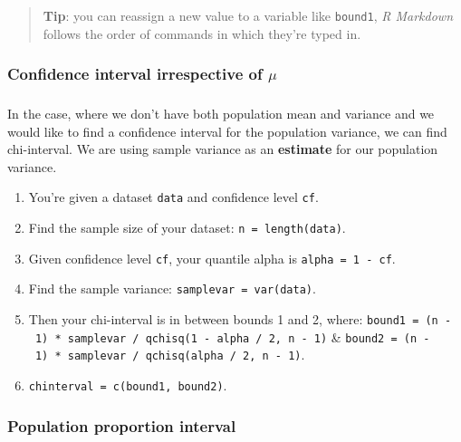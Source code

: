\begin{quote}
\textbf{Tip}: you can reassign a new value to a variable like
\texttt{bound1}, \emph{R Markdown} follows the order of commands in
which they're typed in.
\end{quote}

\hypertarget{confidence-interval-irrespective-of-mu}{%
\subsubsection{\texorpdfstring{Confidence interval irrespective of
\(\mu\)}{Confidence interval irrespective of \textbackslash mu}}\label{confidence-interval-irrespective-of-mu}}

\hypertarget{section-2}{%
\subsubsection{}\label{section-2}}

In the case, where we don't have both population mean and variance and
we would like to find a confidence interval for the population variance,
we can find chi-interval. We are using sample variance as an
\textbf{estimate} for our population variance.

\begin{enumerate}
\def\labelenumi{\arabic{enumi}.}
\tightlist
\item
  You're given a dataset \texttt{data} and confidence level \texttt{cf}.
\item
  Find the sample size of your dataset: \texttt{n\ =\ length(data)}.
\item
  Given confidence level \texttt{cf}, your quantile alpha is
  \texttt{alpha\ =\ 1\ -\ cf}.
\item
  Find the sample variance: \texttt{samplevar\ =\ var(data)}.
\item
  Then your chi-interval is in between bounds 1 and 2, where:
  \texttt{bound1\ =\ (n\ -\ 1)\ *\ samplevar\ /\ qchisq(1\ -\ alpha\ /\ 2,\ n\ -\ 1)}
  \&
  \texttt{bound2\ =\ (n\ -\ 1)\ *\ samplevar\ /\ qchisq(alpha\ /\ 2,\ n\ -\ 1)}.
\item
  \texttt{chinterval\ =\ c(bound1,\ bound2)}.
\end{enumerate}

\hypertarget{population-proportion-interval}{%
\subsubsection{Population proportion
interval}\label{population-proportion-interval}}

